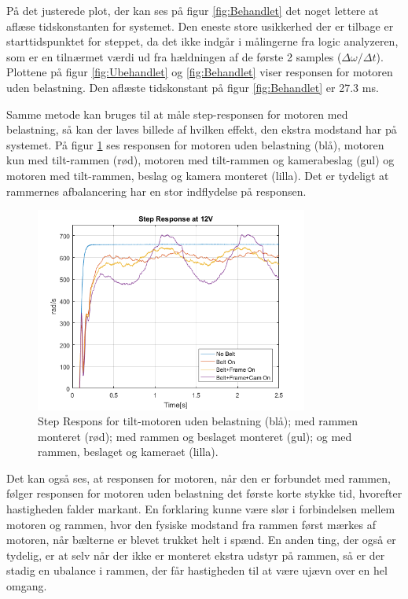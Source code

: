 På det justerede plot, der kan ses på figur \ref{fig:Behandlet} det noget lettere at aflæse tidskonstanten for systemet. Den eneste store usikkerhed der er tilbage er starttidspunktet for steppet, da det ikke indgår i målingerne fra logic analyzeren, som er en tilnærmet værdi ud fra hældningen af de første 2 samples ($\Delta\omega/\Delta t$). Plottene på figur \ref{fig:Ubehandlet} og \ref{fig:Behandlet} viser responsen for motoren uden belastning. Den aflæste tidskonstant på figur \ref{fig:Behandlet} er 27.3 ms.

Samme metode kan bruges til at måle step-responsen for motoren med belastning, så kan der laves billede af hvilken effekt, den ekstra modstand har på systemet. På figur \ref{fig:Combined} ses responsen for motoren uden belastning (blå), motoren kun med tilt-rammen (rød), motoren med tilt-rammen og kamerabeslag (gul) og motoren med tilt-rammen, beslag og kamera monteret (lilla). Det er tydeligt at rammernes afbalancering har en stor indflydelse på responsen.

\begin{figure}[!ht]
	\begin{center}
		\includegraphics[width=0.8\textwidth]{Billeder/Response_Combined.png}
	\end{center}
	\caption{Step Respons for tilt-motoren uden belastning (blå); med rammen monteret (rød); med rammen og beslaget monteret (gul); og med rammen, beslaget og kameraet (lilla).}
	\label{fig:Combined}
\end{figure}

Det kan også ses, at responsen for motoren, når den er forbundet med rammen, følger responsen for motoren uden belastning det første korte stykke tid, hvorefter hastigheden falder markant. En forklaring kunne være slør i forbindelsen mellem motoren og rammen, hvor den fysiske modstand fra rammen først mærkes af motoren, når bælterne er blevet trukket helt i spænd. En anden ting, der også er tydelig, er at selv når der ikke er monteret ekstra udstyr på rammen, så er der stadig en ubalance i rammen, der får hastigheden til at være ujævn over en hel omgang.

